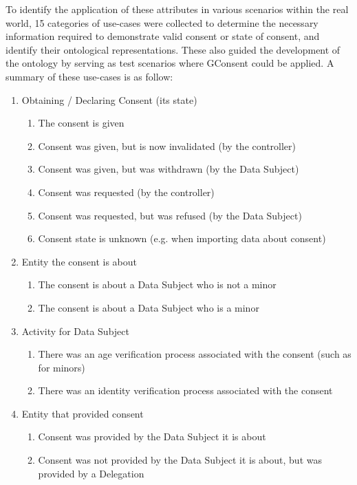 To identify the application of these attributes in various scenarios within the real world, 15 categories of use-cases were collected to determine the necessary information required to demonstrate valid consent or state of consent, and identify their ontological representations.
These also guided the development of the ontology by serving as test scenarios where GConsent could be applied.
A summary of these use-cases is as follow:
\begin{enumerate}
\item
  Obtaining / Declaring Consent (its state)

  \begin{enumerate}
  \item
    The consent is given
  \item
    Consent was given, but is now invalidated (by the controller)
  \item
    Consent was given, but was withdrawn (by the Data Subject)
  \item
    Consent was requested (by the controller)
  \item
    Consent was requested, but was refused (by the Data Subject)
  \item
    Consent state is unknown (e.g. when importing data about consent)
  \end{enumerate}
\item
  Entity the consent is about

  \begin{enumerate}
  \item
    The consent is about a Data Subject who is not a minor
  \item
    The consent is about a Data Subject who is a minor
  \end{enumerate}
\item
  Activity for Data Subject

  \begin{enumerate}
  \item
    There was an age verification process associated with the consent
    (such as for minors)
  \item
    There was an identity verification process associated with the
    consent
  \end{enumerate}
\item
  Entity that provided consent

  \begin{enumerate}
  \item
    Consent was provided by the Data Subject it is about
  \item
    Consent was not provided by the Data Subject it is about, but was
    provided by a Delegation


\end{enumerate}
\end{enumerate}
